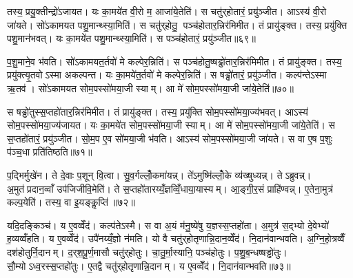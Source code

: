 तस्य॒ प्रयु॒क्तीन्द्रो॑ऽजायत। यः का॒मये॑त वी॒रो म॒ आजा॑ये॒तेति॑। स चतु॑र्‌होतारं॒ प्रयु॑ञ्जीत। आऽस्य॑ वी॒रो जा॑यते। सो॑ऽकामयत पशु॒मान्थ्स्या॒मिति॑। स चतु॑र्‌होतु॒ पञ्च॑होतार॒न्निर॑मिमीत। तं प्रायु॑ङ्क्त। तस्य॒ प्रयु॑क्ति पशु॒मान॑भवत्। यः का॒मये॑त पशु॒मान्थ्स्या॒मिति॑। स पञ्च॑होतारं॒ प्रयु॑ञ्जीत॥६९॥

प॒शु॒माने॒व भ॑वति। सो॑ऽकामयत॒र्तवो॑ मे कल्पेर॒न्निति॑। स पञ्च॑होतु॒ष्षड्ढो॑तार॒न्निर॑मिमीत। तं प्रायु॑ङ्क्त। तस्य॒ प्रयु॑क्त्यृ॒तवोऽस्मा अकल्पन्त। यः का॒मये॑त॒र्तवो॑ मे कल्पेर॒न्निति॑। स षड्ढो॑तारं॒ प्रयु॑ञ्जीत। कल्प॑न्तेऽस्मा ऋ॒तव॑। सो॑ऽकामयत सोम॒पस्सो॑मया॒जी स्याम्। आ मे॑ सोम॒पस्सो॑मया॒जी जा॑ये॒तेति॑॥७०॥

स षड्ढो॑तुस्स॒प्तहो॑तार॒न्निर॑मिमीत। तं प्रायु॑ङ्क्त। तस्य॒ प्रयु॑क्ति सोम॒पस्सो॑मया॒ज्य॑भवत्। आऽस्य॑ सोम॒पस्सो॑मया॒ज्य॑जायत। यः का॒मये॑त सोम॒पस्सो॑मया॒जी स्याम्। आ मे॑ सोम॒पस्सो॑मया॒जी जा॑ये॒तेति॑। स स॒प्तहो॑तारं॒ प्रयु॑ञ्जीत। सो॒म॒प ए॒व सो॑मया॒जी भ॑वति। आऽस्य॑ सोम॒पस्सो॑मया॒जी जा॑यते। स वा ए॒ष प॒शुः प॑ञ्च॒धा प्रति॑तिष्ठति॥७१॥

प॒द्भिर्मुखे॑न। ते दे॒वाः प॒शून् वि॒त्वा। सु॒व॒र्गल्लोँ॒कमा॑यन्न्। ते॑ऽमुष्मि॑ल्लोँ॒के व्य॑ख्षुध्यन्न्। तेऽब्रुवन्न्। अ॒मुत॑प्रदान॒व्वाँ उप॑जिजीवि॒मेति॑। ते स॒प्तहो॑तारय्यँ॒ज्ञव्विँ॒धाया॒यास्यम्। आ॒ङ्गी॒र॒सं प्राहि॑ण्वन्न्। ए॒तेना॒मुत्र॑ कल्प॒येति॑। तस्य॒ वा इ॒यङ्कॢप्ति॑॥७२॥

यदि॒दङ्किञ्च॑। य ए॒वव्वेँद॑। कल्प॑तेऽस्मै। स वा अ॒यं म॑नु॒ष्ये॑षु य॒ज्ञस्स॒प्तहो॑ता। अ॒मुत्र॑ स॒द्भ्यो दे॒वेभ्यो॑ ह॒व्यव्वँ॑हति। य ए॒वव्वेँद॑। उपै॑नय्यँ॒ज्ञो न॑मति। यो वै चतु॑र्‌होतृणान्नि॒दान॒व्वेँद॑। नि॒दान॑वान्भवति। अ॒ग्नि॒हो॒त्रव्वैँ दश॑होतुर्नि॒दानम्। द॒र्‌श॒पू॒र्ण॒मासौ चतु॑र्‌होतुः। चा॒तु॒र्मा॒स्यानि॒ पञ्च॑होतुः। प॒शु॒ब॒न्धष्षड्ढो॑तुः। सौ॒म्योऽध्व॒रस्स॒प्तहो॑तुः। ए॒तद्वै चतु॑र्‌होतृणान्नि॒दानम्। य ए॒वव्वेँद॑। नि॒दान॑वान्भवति॥७३॥




